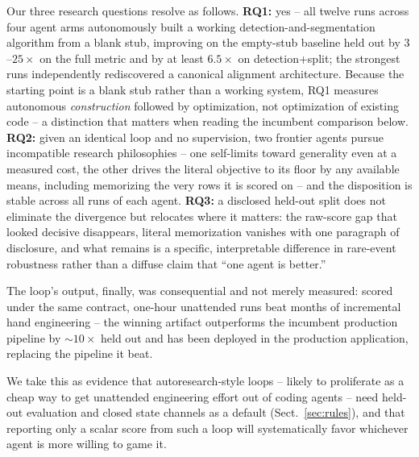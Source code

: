 \documentclass[runningheads]{llncs}
\begin{document}
Our three research questions resolve as follows. \textbf{RQ1:} yes -- all
twelve runs across four agent arms autonomously built a working
detection-and-segmentation algorithm from a blank stub, improving on the
empty-stub baseline held out by $3$--$25\times$ on the full metric and by
at least $6.5\times$ on detection+split; the strongest runs independently
rediscovered a canonical alignment architecture. Because the starting point
is a blank stub rather than a working system, RQ1 measures autonomous
\emph{construction} followed by optimization, not optimization of existing
code -- a distinction that matters when reading the incumbent comparison
below.
\textbf{RQ2:} given an identical loop and no supervision, two frontier
agents pursue incompatible research philosophies -- one self-limits toward
generality even at a measured cost, the other drives the literal objective
to its floor by any available means, including memorizing the very rows it
is scored on -- and the disposition is stable across all runs of each agent.
\textbf{RQ3:} a disclosed held-out split does not eliminate the divergence
but relocates where it matters: the raw-score gap that looked decisive
disappears, literal memorization vanishes with one paragraph of disclosure,
and what remains is a specific, interpretable difference in rare-event
robustness rather than a diffuse claim that ``one agent is better.''

The loop's output, finally, was consequential and not merely measured:
scored under the same contract, one-hour unattended runs beat months of
incremental hand engineering -- the winning artifact outperforms the
incumbent production pipeline by $\sim\!10\times$ held out and has been
deployed in the production application, replacing the pipeline it beat.

We take this as evidence that autoresearch-style loops -- likely
to proliferate as a cheap way to get unattended engineering effort out of
coding agents -- need held-out evaluation and closed state channels as a
default (Sect.~\ref{sec:rules}), and that reporting only a scalar score from
such a loop will systematically favor whichever agent is more willing to
game it.
\end{document}
